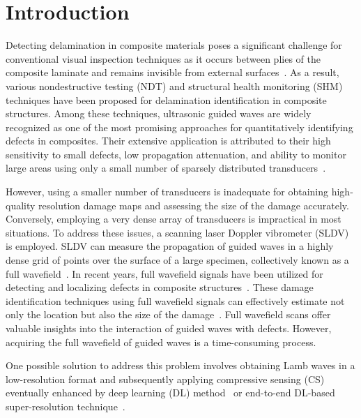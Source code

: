 \section{Introduction}

Detecting delamination in composite materials poses a significant challenge for conventional visual inspection techniques as it occurs between plies of the composite laminate and remains invisible from external surfaces~\cite{staszewski2009health, tuo2019damage}. 
As a result, various nondestructive testing (NDT) and structural health monitoring (SHM) techniques have been proposed for delamination identification in composite structures. 
Among these techniques, ultrasonic guided waves are widely recognized as one of the most promising approaches for quantitatively identifying defects in composites. 
Their extensive application is attributed to their high sensitivity to small defects, low propagation attenuation, and ability to monitor large areas using only a small number of sparsely distributed transducers~\cite{Barthorpe2020, Ihn2008, Cantero-Chinchilla2020}.

However, using a smaller number of transducers is inadequate for obtaining high-quality resolution damage maps and assessing the size of the damage accurately. 
Conversely, employing a very dense array of transducers is impractical in most situations. To address these issues, a scanning laser Doppler vibrometer (SLDV) is employed. 
SLDV can measure the propagation of guided waves in a highly dense grid of points over the surface of a large specimen, collectively known as a full wavefield~\cite{Radzienski2019a}. 
In recent years, full wavefield signals have been utilized for detecting and localizing defects in composite structures~\cite{Radzienski2019a, Girolamo2018a, kudela2018impact, rogge2013characterization}. 
These damage identification techniques using full wavefield signals can effectively estimate 
not only the location but also the size of the damage~\cite{Girolamo2018a, kudela2018impact}. 
Full wavefield scans offer valuable insights into the interaction of guided waves with defects. However, acquiring the full wavefield of guided waves is a time-consuming process.

One possible solution to address this problem involves obtaining Lamb waves in a low-resolution format and subsequently applying compressive sensing (CS) eventually enhanced by deep learning (DL) method~\cite{esfandabadideep} or end-to-end DL-based super-resolution technique~\cite{ijjeh2023deep}. 

